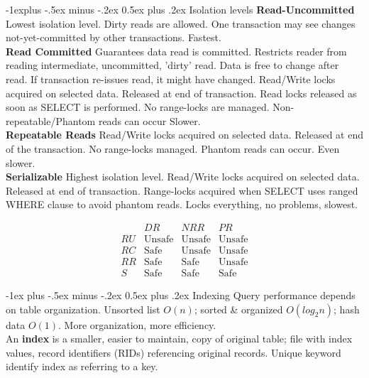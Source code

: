 \documentclass[10pt,landscape]{article}
\makeatletter
\renewcommand{\section}{\@startsection{section}{1}{0mm}%
                                {-1ex plus -.5ex minus -.2ex}%
                                {0.5ex plus .2ex}%
                                {\normalfont\large\bfseries}}
\renewcommand{\subsection}{\@startsection{subsection}{2}{0mm}%
                                {-1explus -.5ex minus -.2ex}%
                                {0.5ex plus .2ex}%
                                {\normalfont\normalsize\bfseries}}
\makeatother
\begin{document}
\begin{multicols}{3}
\subsection{Isolation levels}
\textbf{Read-Uncommitted}
Lowest isolation level. 
Dirty reads are allowed. 
One transaction may see changes not-yet-committed by other transactions.
Fastest.\\
\textbf{Read Committed}
Guarantees data read is committed.
Restricts reader from reading intermediate, uncommitted, 'dirty' read.
Data is free to change after read.
If transaction re-issues read, it might have changed.
Read/Write locks acquired on selected data.
Released at end of transaction.
Read locks released as soon as SELECT is performed.
No range-locks are managed.
Non-repeatable/Phantom reads can occur
Slower.\\
\textbf{Repeatable Reads}
Read/Write locks acquired on selected data.
Released at end of the transaction.
No range-locks managed.
Phantom reads can occur.
Even slower.\\
\textbf{Serializable}
Highest isolation level.
Read/Write locks acquired on selected data.
Released at end of transaction.
Range-locks acquired when SELECT uses ranged WHERE clause to avoid phantom reads.
Locks everything, no problems, slowest.

\begin{equation*}
\begin{array}{cccc}
& DR & NRR & PR \\
RU & \text{Unsafe} & \text{Unsafe} & \text{Unsafe}\\
RC & \text{Safe} & \text{Unsafe} & \text{Unsafe}\\
RR & \text{Safe} & \text{Safe} & \text{Unsafe}\\
S & \text{Safe} & \text{Safe} & \text{Safe}
\end{array}
\end{equation*}

\section{Indexing}
Query performance depends on table organization. Unsorted list $O(n)$; sorted \& organized $O(log_2n)$; hash data $O(1)$. 
More organization, more efficiency.\\
An \textbf{index} is a smaller, easier to maintain, copy of original table; file with index values, record identifiers (RIDs) referencing original records. Unique keyword identify index as referring to a key.\\



\end{multicols}
\end{document}
